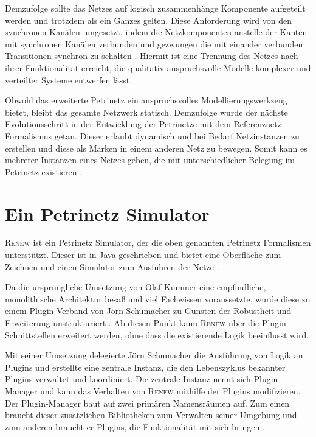 	Demzufolge sollte das Netzes auf logisch zusammenhänge Komponente aufgeteilt werden und trotzdem als ein Ganzes gelten. Diese Anforderung wird von den synchronen Kanälen umgesetzt, indem die Netzkomponenten anstelle der Kanten mit synchronen Kanälen verbunden und gezwungen die mit einander verbunden Transitionen synchron zu schalten \cite{Kummer02}. Hiermit ist eine Trennung des Netzes nach ihrer Funktionalität erreicht, die qualitativ anspruchsvolle Modelle komplexer und verteilter Systeme entwerfen lässt.\bigbreak

	Obwohl das erweiterte Petrinetz ein anspruchsvolles Modellierungswerkzeug bietet, bleibt das gesamte Netzwerk statisch. Demzufolge wurde der nächste Evolutionsschritt in der Entwicklung der Petrinetze mit dem Referenznetz Formalismus getan. Dieser erlaubt dynamisch und bei Bedarf Netzinstanzen zu erstellen und diese als Marken in einem anderen Netz zu bewegen. Somit kann es mehrerer Instanzen eines Netzes geben, die mit unterschiedlicher Belegung im Petrinetz existieren \cite{Kummer02}.

\section{Ein Petrinetz Simulator} \label{sec:EPS}

	\textsc{Renew} ist ein Petrinetz Simulator, der die oben genannten Petrinetz Formalismen unterstützt. Dieser ist in Java geschrieben und bietet eine Oberfläche zum Zeichnen und einen Simulator zum Ausführen der Netze \cite{Kummer+99a}.\bigbreak

	Da die ursprüngliche Umsetzung von Olaf Kummer eine empfindliche, monolithische Architektur besaß und viel Fachwissen voraussetzte, wurde diese zu einem Plugin Verband von Jörn Schumacher zu Gunsten der Robustheit und Erweiterung unstrukturiert \cite{Schumacher03}. Ab diesen Punkt kann \textsc{Renew} über die Plugin Schnittstellen erweitert werden, ohne dass die existierende Logik beeinflusst wird.\bigbreak

	Mit seiner Umsetzung delegierte Jörn Schumacher die Ausführung von Logik an Plugins und erstellte eine zentrale Instanz, die den Lebenszyklus bekannter Plugins verwaltet und koordiniert. Die zentrale Instanz nennt sich Plugin-Manager und kann das Verhalten von \textsc{Renew} mithilfe der Plugins modifizieren. Der Plugin-Manager baut auf zwei primären Namensräumen auf. Zum einen braucht dieser zusätzlichen Bibliotheken zum Verwalten seiner Umgebung und zum anderen braucht er Plugins, die Funktionalität mit sich bringen \cite{Duvigneau09}.

